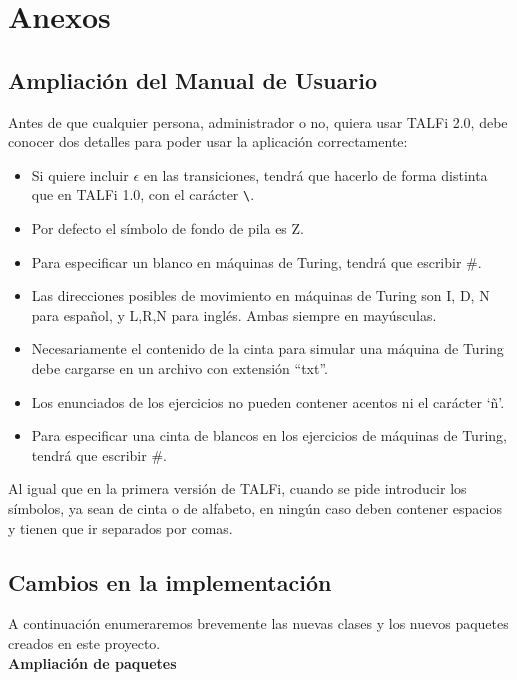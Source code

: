 \documentclass[12pt,a4paper,spanish]{book}
\newcommand{\clearemptydoublepage}{\newpage{\pagestyle{empty}
\cleardoublepage}}
\begin{document}
\clearemptydoublepage
\chapter{Anexos}
\section{Ampliaci\'on del Manual de Usuario}
Antes de que cualquier persona, administrador o no, quiera usar TALFi 2.0, debe conocer dos detalles para poder usar la aplicaci\'on correctamente:\\
\begin{itemize}
\item Si quiere incluir $\epsilon$ en las transiciones, tendr\'a que hacerlo de forma distinta que en TALFi 1.0, con el car\'acter \verb'\'.
\item Por defecto el s\'imbolo de fondo de pila es Z.
\item Para especificar un blanco en m\'aquinas de Turing, tendr\'a que escribir $\#$.
\item Las direcciones posibles de movimiento en m\'aquinas de Turing son I, D, N para espa\~nol, y L,R,N para ingl\'es. Ambas siempre en may\'usculas. 
\item Necesariamente el contenido de la cinta para simular una m\'aquina de Turing debe cargarse en un archivo con extensi\'on ``txt''.
\item Los enunciados de los ejercicios no pueden contener acentos ni el car\'acter `\~{n}'.
\item Para especificar una cinta de blancos en los ejercicios de m\'aquinas de Turing, tendr\'a que escribir $\#$.
\end{itemize}
Al igual que en la primera versi\'on de TALFi, cuando se pide introducir los s\'imbolos, ya sean de cinta o de alfabeto, en ning\'un caso deben contener espacios y tienen que ir separados por comas.


\section{Cambios en la implementaci\'on}
A continuaci\'on enumeraremos brevemente las nuevas clases y los nuevos paquetes creados en este proyecto.\\
\newline
{\bf Ampliaci\'{o}n de paquetes}
\end{document}
